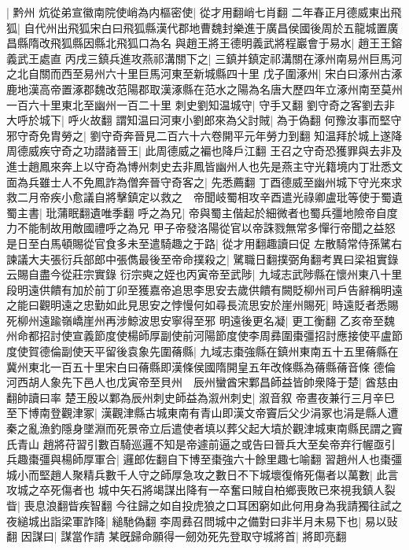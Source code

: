 |{
	黔州}
炕從弟宣徽南院使峭為内樞密使|{
	從才用翻峭七肖翻}
二年春正月德威東出飛狐|{
	自代州出飛狐宋白曰飛狐縣漢代郡地曹魏封樂進于廣昌侯國後周於五龍城置廣昌縣隋改飛狐縣因縣北飛狐口為名}
與趙王將王德明義武將程巖會于易水|{
	趙王王鎔義武王處直}
丙戌三鎮兵進攻燕祁溝關下之|{
	三鎮并鎮定祁溝關在涿州南易州巨馬河之北自關而西至易州六十里巨馬河東至新城縣四十里}
戊子圍涿州|{
	宋白曰涿州古涿鹿地漢高帝置涿郡魏改范陽郡取漢涿縣在范水之陽為名唐大歷四年立涿州南至莫州一百六十里東北至幽州一百二十里}
刺史劉知温城守|{
	守手又翻}
劉守奇之客劉去非大呼於城下|{
	呼火故翻}
謂知温曰河東小劉郎來為父討賊|{
	為于偽翻}
何豫汝事而堅守邪守奇免胄勞之|{
	劉守奇奔晉見二百六十六卷開平元年勞力到翻}
知温拜於城上遂降周德威疾守奇之功譛諸晉王|{
	此周德威之褊也降戶江翻}
王召之守奇恐獲罪與去非及進士趙鳳來奔上以守奇為博州刺史去非鳳皆幽州人也先是燕主守光籍境内丁壯悉文面為兵雖士人不免鳳詐為僧奔晉守奇客之|{
	先悉薦翻}
丁酉德威至幽州城下守光來求救二月帝疾小愈議自將擊鎮定以救之　帝聞岐蜀相攻辛酉遣光祿卿盧玭等使于蜀遺蜀主書|{
	玭蒲眠翻遺唯季翻}
呼之為兄|{
	帝與蜀主偕起於細微者也蜀兵彊地險帝自度力不能制故用敵國禮呼之為兄}
甲子帝發洛陽從官以帝誅戮無常多憚行帝聞之益怒是日至白馬頓賜從官食多未至遣騎趣之于路|{
	從才用翻趣讀曰促}
左散騎常侍孫騭右諫議大夫張衍兵部郎中張儁最後至帝命撲殺之|{
	騭職日翻撲弼角翻考異曰梁祖實錄云賜自盡今從莊宗實錄}
衍宗奭之姪也丙寅帝至武陟|{
	九域志武陟縣在懷州東八十里}
段明遠供饋有加於前丁卯至獲嘉帝追思李思安去歲供饋有闕貶柳州司戶告辭稱明遠之能曰觀明遠之忠勤如此見思安之悖慢何如尋長流思安於崖州賜死|{
	時遠貶者悉賜死柳州遠踰嶺嶠崖州再涉鯨波思安寧得至邪}
明遠後更名凝|{
	更工衡翻}
乙亥帝至魏州命都招討使宣義節度使楊師厚副使前河陽節度使李周彞圍棗彊招討應接使平盧節度使賀德倫副使天平留後袁象先圍蓨縣|{
	九域志棗強縣在鎮州東南五十五里蓨縣在冀州東北一百五十里宋白曰蓨縣即漢條侯國隋開皇五年改條縣為蓨縣蓨音條}
德倫河西胡人象先下邑人也戊寅帝至貝州　辰州蠻酋宋鄴昌師益皆帥衆降于楚|{
	酋慈由翻帥讀曰率}
楚王殷以鄴為辰州刺史師益為溆州刺史|{
	溆音叙}
帝晝夜兼行三月辛巳至下博南登觀津冢|{
	漢觀津縣古城東南有青山即漢文帝竇后父少涓冢也涓是縣人遭秦之亂漁釣隱身墜淵而死景帝立后遣使者填以葬父起大墳於觀津城東南縣民謂之竇氏青山}
趙將苻習引數百騎巡邏不知是帝遽前逼之或告曰晉兵大至矣帝弃行幄亟引兵趣棗彊與楊師厚軍合|{
	邏郎佐翻自下博至棗強六十餘里趣七喻翻}
習趙州人也棗彊城小而堅趙人聚精兵數千人守之師厚急攻之數日不下城壞復脩死傷者以萬數|{
	此言攻城之卒死傷者也}
城中矢石將竭謀出降有一卒奮曰賊自柏鄉喪敗已來視我鎮人裂眥|{
	喪息浪翻眥疾智翻}
今往歸之如自投虎狼之口耳困窮如此何用身為我請獨往試之夜縋城出詣梁軍詐降|{
	縋馳偽翻}
李周彞召問城中之備對曰非半月未易下也|{
	易以䜴翻}
因謀曰|{
	謀當作請}
某旣歸命願得一劒効死先登取守城將首|{
	將即亮翻}
